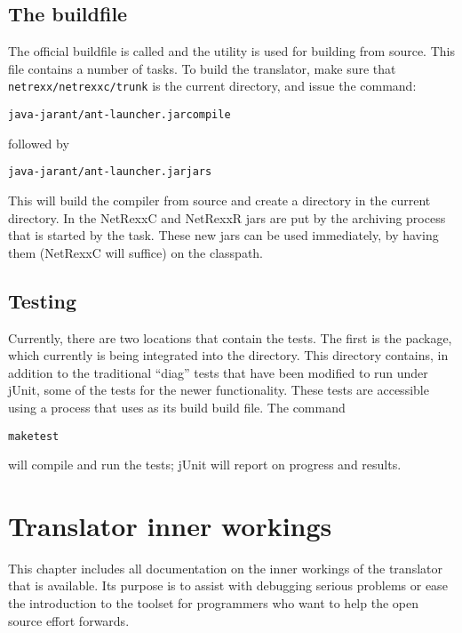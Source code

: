 \section{The buildfile}
The official buildfile is called  and the
 utility is used for building \nr{} from source. This
file contains a number of tasks. To build
the translator, make sure that \texttt{netrexx/netrexxc/trunk} is the
current directory, and issue the command:
\begin{alltt}
java -jar ant/ant-launcher.jar compile
\end{alltt}
followed by
\begin{alltt}
java -jar ant/ant-launcher.jar jars
\end{alltt}
This will build the compiler from source and create a 
directory in the current directory. In  the
NetRexxC and NetRexxR jars are put by the archiving process that is
started by the  task. These new jars can be used
immediately, by having them (NetRexxC will suffice) on the classpath.
\section{Testing}
Currently, there are two locations that contain the tests. The first
is the  package, which currently is
being integrated into the  directory. This
directory contains, in addition to the traditional ``diag'' tests that
have been modified to run under jUnit, some of the tests for the newer
functionality. These tests are accessible using a 
process that uses  as its build build file. The
command
\begin{alltt}
make test
\end{alltt}
will compile and run the tests; jUnit will report on progress and
results.
\chapter{Translator inner workings}
This chapter includes all documentation on the inner workings of the
translator that is available. Its purpose is to assist with debugging
serious problems or ease the introduction to the toolset for
programmers who want to help the open source effort forwards.
